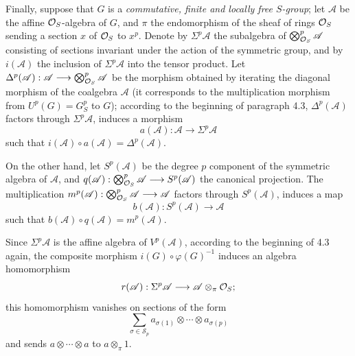 Finally, suppose that $G$ is a \emph{commutative, finite and locally free $S$-group}; let $\mathscr A$ be the affine $\mathcal{O}_S$-algebra of $G$, and $\pi$ the endomorphism of the sheaf of rings $\mathcal{O}_S$ sending a section $x$ of $\mathcal{O}_S$ to $x^p$. Denote by $\Sigma^p\mathscr A$ the subalgebra of $\bigotimes_{\mathcal{O}_S}^p\mathscr A$ consisting of sections invariant under the action of the symmetric group, and by $i(\mathscr A)$ the inclusion of $\Sigma^p\mathscr A$ into the tensor product. Let $\Delta^p(\mathscr A):\mathscr A\longrightarrow\bigotimes_{\mathcal{O}_S}^p\mathscr A$ be the morphism obtained by iterating the diagonal morphism of the coalgebra $\mathscr A$ (it corresponds to the multiplication morphism from $U^p(G)=G_S^p$ to $G$); according to the beginning of paragraph 4.3, $\Delta^p(\mathscr A)$ factors through $\Sigma^p\mathscr A$, \ie induces a morphism
\[
a(\mathscr A):\mathscr A\longrightarrow\Sigma^p\mathscr A
\]
such that $i(\mathscr A)\circ a(\mathscr A)=\Delta^p(\mathscr A)$.

On the other hand, let $S^p(\mathscr A)$ be the degree $p$ component of the symmetric algebra of $\mathscr A$, and $q(\mathscr A):\bigotimes_{\mathcal{O}_S}^p\mathscr A\longrightarrow S^p(\mathscr A)$ the canonical projection. The multiplication $m^p(\mathscr A):\bigotimes_{\mathcal{O}_S}^p\mathscr A\longrightarrow\mathscr A$ factors through $S^p(\mathscr A)$, \ie induces a map
\[
b(\mathscr A):S^p(\mathscr A)\longrightarrow\mathscr A
\]
such that $b(\mathscr A)\circ q(\mathscr A)=m^p(\mathscr A)$.

Since $\Sigma^p\mathscr A$ is the affine algebra of $V^p(\mathscr A)$, according to the beginning of 4.3 again, the composite morphism $i(G)\circ\varphi(G)^{-1}$ induces an algebra homomorphism
\[
r(\mathscr A):\Sigma^p\mathscr A\longrightarrow\mathscr A\otimes_\pi\mathcal{O}_S;
\]
this homomorphism vanishes on sections of the form
\[
\sum_{\sigma\in\mathscr S_p}a_{\sigma(1)}\otimes\cdots\otimes a_{\sigma(p)}
\]
and sends $a\otimes\cdots\otimes a$ to $a\otimes_\pi1$.
